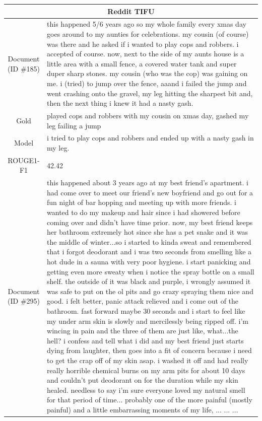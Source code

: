 \begin{table}[bth!]
\scriptsize
\centering
\renewcommand{\arraystretch}{1.3}
\begin{tabular}{c|p{}}
\hline
\multicolumn{2}{c}{Reddit TIFU} \\ \hline
\makecell{Document\\(ID \#185)} & 
this happened 5/6 years ago so my whole family every xmas day goes around to my aunties for celebrations. my cousin (of course) was there and he asked if i wanted to play cops and robbers. i accepted of course. now, next to the side of my aunts house is a little area with a small fence, a covered water tank and super duper sharp stones. my cousin (who was the cop) was gaining on me. i (tried) to jump over the fence, aaand i failed the jump and went crashing onto the gravel, my leg hitting the sharpest bit and, then the next thing i knew it had a nasty gash.
\\ \hline
Gold & 
played cops and robbers with my cousin on xmas day, gashed my leg failing a jump
\\ \hline
Model & 
i tried to play cops and robbers and ended up with a nasty gash in my leg.
\\ \hline
ROUGE1-F1 & 
42.42
\\ \hline
\makecell{Document\\(ID \#295)} & 
this happened about 3 years ago at my best friend's apartment. i had come over to meet our friend's new boyfriend and go out for a fun night of bar hopping and meeting up with more friends. i wanted to do my makeup and hair since i had showered before coming over and didn't have time prior. now, my best friend keeps her bathroom extremely hot since she has a pet snake and it was the middle of winter...so i started to kinda sweat and remembered that i forgot deodorant and i was two seconds from smelling like a hot dude in a sauna with very poor hygiene. i start panicking and getting even more sweaty when i notice the spray bottle on a small shelf. the outside of it was black and purple, i wrongly assumed it was safe to put on the ol pits and go crazy spraying them nice and good. i felt better, panic attack relieved and i come out of the bathroom. fast forward maybe 30 seconds and i start to feel like my under arm skin is slowly and mercilessly being ripped off. i'm wincing in pain and the three of them are just like, what...the hell? i confess and tell what i did and my best friend just starts dying from laughter, then goes into a fit of concern because i need to get the crap off of my skin asap. i washed it off and had really really horrible chemical burns on my arm pits for about 10 days and couldn't put deodorant on for the duration while my skin healed. needless to say i'm sure everyone loved my natural smell for that period of time... probably one of the more painful (mostly painful) and a little embarrassing moments of my life, ... ... ... 

\end{tabular}
\end{table}

